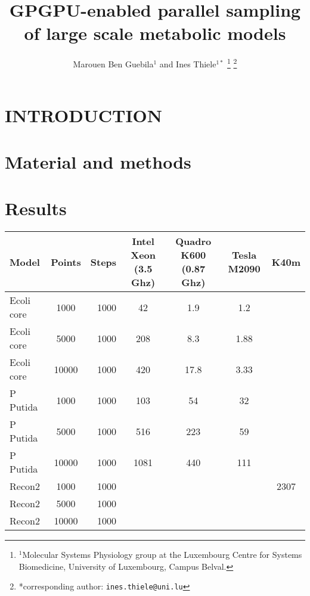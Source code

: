 \documentclass[letterpaper, 10 pt, conference]{ieeeconf}  %
\title{\LARGE \bf
GPGPU-enabled parallel sampling of large scale metabolic models
}
\author{Marouen Ben Guebila$^{1}$ and Ines Thiele$^{1*}$%
\thanks{$^{1}$Molecular Systems Physiology group at the Luxembourg Centre for Systems Biomedicine,
        University of Luxembourg, Campus Belval.
        }%
\thanks{*corresponding author: {\tt\small ines.thiele@uni.lu}}
}
\begin{document}
\maketitle
\thispagestyle{empty}
\pagestyle{empty}


\begin{abstract}



\end{abstract}


\section{INTRODUCTION}




\addtolength{\textheight}{-12cm}   %








\section{Material and methods}

\section{Results}
\begin{tabular}{|l|c|r|c|c|c|c|}
  \hline
  Model & Points & Steps & Intel Xeon (3.5 Ghz) & Quadro K600 (0.87 Ghz) & Tesla M2090 & K40m \\
  \hline
   Ecoli core& 1000& 1000& 42 & 1.9 & 1.2&\\
   Ecoli core& 5000& 1000& 208 & 8.3 & 1.88&\\
   Ecoli core& 10000& 1000& 420 & 17.8 & 3.33&\\
   P Putida  & 1000& 1000& 103 & 54 & 32&\\
   P Putida  & 5000& 1000& 516 &  223 & 59&\\
   P Putida  & 10000& 1000& 1081 & 440 & 111&\\
   Recon2  & 1000& 1000&  & & &2307\\
   Recon2  & 5000& 1000&  & & &\\
   Recon2  & 10000& 1000&  & & &\\
  \hline
\end{tabular}
\end{document}
